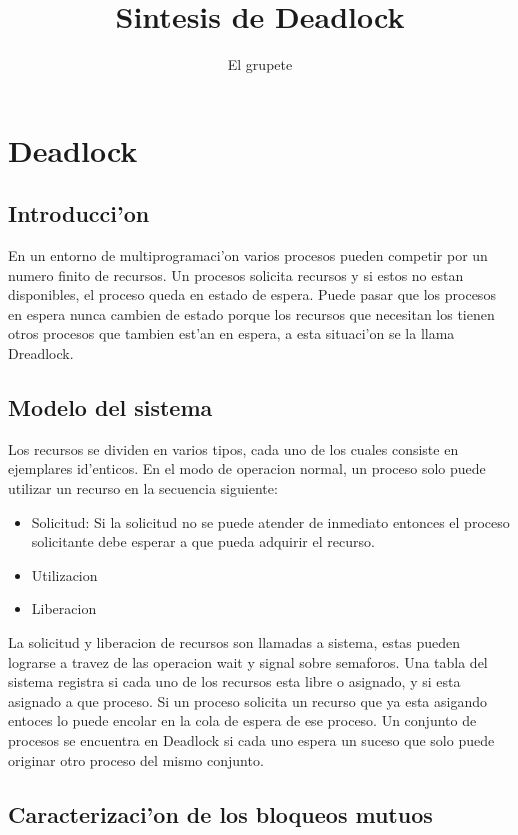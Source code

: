 \documentclass[a4paper,10pt]{article}
\title{Sintesis de Deadlock}
\author{El grupete}
\begin{document}
\maketitle


\section{Deadlock}

\subsection{Introducci'on}
En un entorno de multiprogramaci'on varios procesos pueden competir por un numero finito de recursos. Un procesos solicita recursos y si estos no estan disponibles, el proceso queda en estado de espera. Puede pasar que los procesos en espera nunca cambien de estado porque los recursos que necesitan los tienen otros procesos que tambien est'an en espera, a esta situaci'on se la llama Dreadlock.

\subsection{Modelo del sistema}
Los recursos se dividen en varios tipos, cada uno de los cuales consiste en ejemplares id'enticos. 
En el modo de operacion normal, un proceso solo puede utilizar un recurso en la secuencia siguiente:
\begin{itemize}
 \item Solicitud: Si la solicitud no se puede atender de inmediato entonces el proceso solicitante debe esperar a que pueda adquirir el recurso.
 \item Utilizacion
 \item Liberacion
\end{itemize}
La solicitud y liberacion de recursos son llamadas a sistema, estas pueden lograrse a travez de las operacion wait y signal sobre semaforos.
Una tabla del sistema registra si cada uno de los recursos esta libre o asignado, y si esta asignado a que proceso. Si un proceso solicita un recurso que ya esta asigando entoces lo puede encolar en la cola de espera de ese proceso.
Un conjunto de procesos se encuentra en Deadlock si cada uno espera un suceso que solo puede originar otro proceso del mismo conjunto.

\subsection{Caracterizaci'on de los bloqueos mutuos}
\end{document}
